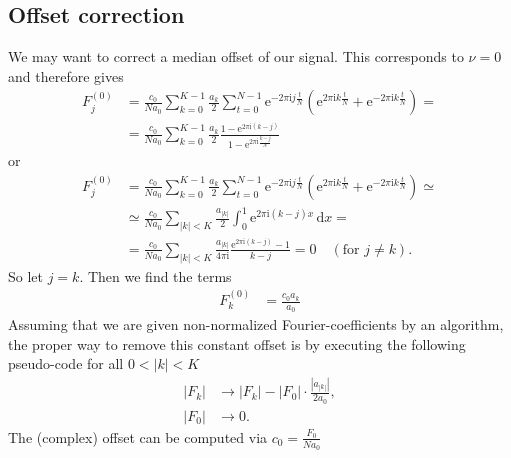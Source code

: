 \documentclass[english, parskip=full]{scrartcl}
\newcommand{\intx}{}
\newcommand{\kla}{}
\newcommand{\tecxt}{}
\renewcommand{\i}{\text{i}}
\newcommand{\e}{\text{e}}
\begin{document}
\subsection{Offset correction}
We may want to correct a median offset of our signal.
This corresponds to $\nu=0$ and therefore gives
\begin{align}
F_j^{(0)} &= \frac{c_0}{Na_0} \sum_{k=0}^{K-1} \frac{a_k}{2} \sum_{t=0}^{N-1} \e^{-2\pi\i j\frac{t}{N}} \kla\left( \e^{2\pi\i k\frac{t}{N}} + \e^{-2\pi\i k\frac{t}{N}} \right) = \\
&= \frac{c_0}{Na_0}  \sum_{k=0}^{K-1} \frac{a_k}{2} \frac{1 - \e^{2\pi\i (k-j)}}{1 - \e^{2\pi\i \frac{k-j}{N}}}
\end{align}
or
\begin{align}
F_j^{(0)} &= \frac{c_0}{Na_0} \sum_{k=0}^{K-1} \frac{a_k}{2} \sum_{t=0}^{N-1} \e^{-2\pi\i j\frac{t}{N}} \kla\left( \e^{2\pi\i k\frac{t}{N}} + \e^{-2\pi\i k\frac{t}{N}} \right) \simeq \\
&\simeq \frac{c_0}{Na_0}  \sum_{|k|<K} \frac{a_{|k|}}{2} \intx\int_{0}^{1} \e^{2\pi\i (k-j)x}\, \mathrm{d}x = \\
&= \frac{c_0}{Na_0}  \sum_{|k|<K} \frac{a_{|k|}}{4\pi\i} \frac{\e^{2\pi\i (k-j)} - 1}{k-j} = 0\quad (\tecxt\text{for } j\neq k).
\end{align}
So let $j=k$.
Then we find the terms
\begin{align}
F_k^{(0)} &= \frac{c_0a_k}{a_0}
\end{align}
Assuming that we are given non-normalized Fourier-coefficients by an algorithm, the proper way to remove this constant offset is by executing the following pseudo-code for all $0<|k|<K$
\begin{align}
|F_k| &\rightarrow |F_k| - |F_0|\cdot\frac{|a_{|k|}|}{2a_0},\\
|F_0| &\rightarrow 0.
\end{align}
The (complex) offset can be computed via $c_0 = \frac{F_0}{Na_0}$
\end{document}
